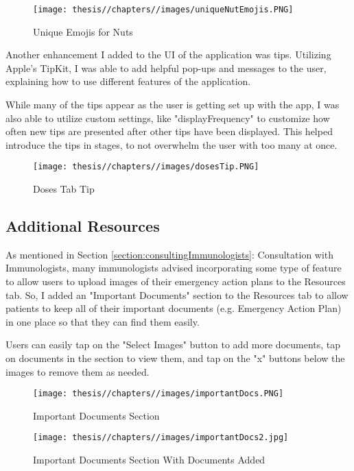 \begin{figure} [H]
    \centering
    \texttt{[image: thesis//chapters//images/uniqueNutEmojis.PNG]}
    \caption{Unique Emojis for Nuts}
 
\end{figure}

Another enhancement I added to the UI of the application was tips. Utilizing Apple's TipKit, I was able to add helpful pop-ups and messages to the user, explaining how to use different features of the application.

While many of the tips appear as the user is getting set up with the app, I was also able to utilize custom settings, like "displayFrequency" to customize how often new tips are presented after other tips have been displayed. This helped introduce the tips in stages, to not overwhelm the user with too many at once.

\begin{figure} [H]
    \centering
    \texttt{[image: thesis//chapters//images/dosesTip.PNG]}
    \caption{Doses Tab Tip}
 
\end{figure}

\subsection{Additional Resources}

As mentioned in Section \ref{section:consultingImmunologists}: Consultation with Immunologists, many immunologists advised incorporating some type of feature to allow users to upload images of their emergency action plans to the Resources tab. So, I added an "Important Documents" section to the Resources tab to allow patients to keep all of their important documents (e.g. Emergency Action Plan) in one place so that they can find them easily.

Users can easily tap on the "Select Images" button to add more documents, tap on documents in the section to view them, and tap on the "x" buttons below the images to remove them as needed.

\begin{figure} [H]
    \centering
    \texttt{[image: thesis//chapters//images/importantDocs.PNG]}
    \caption{Important Documents Section}
 
\end{figure}

\begin{figure} [H]
    \centering
    \texttt{[image: thesis//chapters//images/importantDocs2.jpg]}
    \caption{Important Documents Section With Documents Added}
 
\end{figure}

